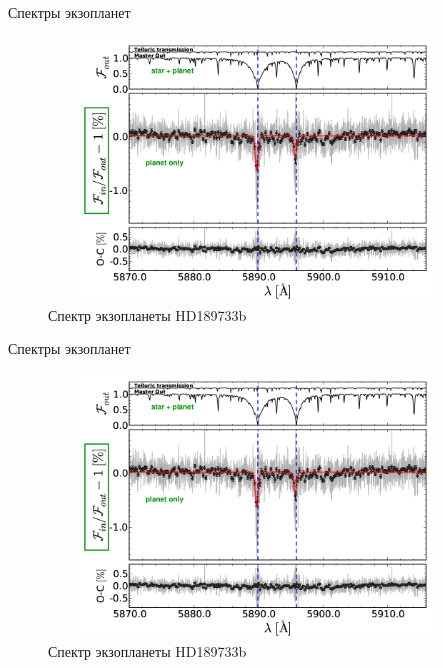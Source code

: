 \documentclass[
]{beamer}
\begin{document}
	\begin{frame}{Спектры экзопланет}
		\begin{figure}[H]
			\centering
			\includegraphics[width=11cm, height=7cm]{exo1.png}
			\caption{Спектр экзопланеты HD189733b}
		\end{figure}
	\end{frame}

	\begin{frame}{Спектры экзопланет}
		\begin{figure}[H]
			\centering
			\includegraphics[width=11cm, height=7cm]{exo1.png}
			\caption{Спектр экзопланеты HD189733b}
		\end{figure}
	\end{frame}
\end{document}
